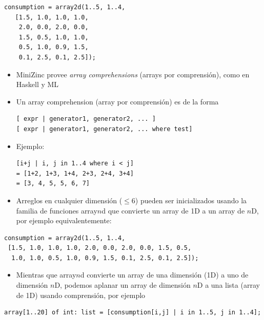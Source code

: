 \documentclass[12pt]{article}
\begin{document}
\begin{Verbatim}
consumption = array2d(1..5, 1..4, 
   [1.5, 1.0, 1.0, 1.0,
    2.0, 0.0, 2.0, 0.0,
    1.5, 0.5, 1.0, 1.0,
    0.5, 1.0, 0.9, 1.5,
    0.1, 2.5, 0.1, 2.5]);
\end{Verbatim}

\begin{itemize}
\item MiniZinc provee \textit{array comprehensions} (arrays por comprensión), como en Haskell y ML
\item Un array comprehension (array por comprensión) es de la forma 
\begin{Verbatim}
[ expr | generator1, generator2, ... ]
[ expr | generator1, generator2, ... where test]
\end{Verbatim}
\item Ejemplo:
\begin{Verbatim}
[i+j | i, j in 1..4 where i < j]
= [1+2, 1+3, 1+4, 2+3, 2+4, 3+4]
= [3, 4, 5, 5, 6, 7]
\end{Verbatim}
\end{itemize}

\begin{itemize}
\item Arreglos en cualquier dimensión ($\leq 6$) pueden ser inicializados usando la familia de funciones array$n$d que convierte un array de 1D a un array de $n$D, por ejemplo equivalentemente: 
\end{itemize}

\begin{Verbatim}
consumption = array2d(1..5, 1..4,  
 [1.5, 1.0, 1.0, 1.0, 2.0, 0.0, 2.0, 0.0, 1.5, 0.5, 
  1.0, 1.0, 0.5, 1.0, 0.9, 1.5, 0.1, 2.5, 0.1, 2.5]);
\end{Verbatim}

\begin{itemize}
\item Mientras que array$n$d convierte un array de una dimensión (1D) a uno de dimensión $n$D, podemos aplanar un array de dimensión $n$D a una lista (array de 1D) usando comprensión, por ejemplo
\end{itemize}

\begin{Verbatim}
array[1..20] of int: list = [consumption[i,j] | i in 1..5, j in 1..4];
\end{Verbatim}

\newpage
\end{document}
